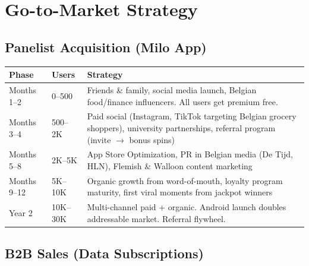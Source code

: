 \documentclass[11pt,a4paper]{article}
\begin{document}
\clearpage

\section{Go-to-Market Strategy}

\subsection{Panelist Acquisition (Milo App)}

\begin{center}
\renewcommand{\arraystretch}{1.3}
\begin{tabularx}{\textwidth}{C{2cm} C{2cm} L{9cm}}
\toprule
{}
\textbf{\color{white}Phase} & \textbf{\color{white}Users} & \textbf{\color{white}Strategy} \\
\midrule
Months 1--2 & 0--500 & Friends \& family, social media launch, Belgian food/finance influencers. All users get premium free. \\
Months 3--4 & 500--2K & Paid social (Instagram, TikTok targeting Belgian grocery shoppers), university partnerships, referral program (invite $\rightarrow$ bonus spins) \\
Months 5--8 & 2K--5K & App Store Optimization, PR in Belgian media (De Tijd, HLN), Flemish \& Walloon content marketing \\
Months 9--12 & 5K--10K & Organic growth from word-of-mouth, loyalty program maturity, first viral moments from jackpot winners \\
Year 2 & 10K--30K & Multi-channel paid + organic. Android launch doubles addressable market. Referral flywheel. \\
\bottomrule
\end{tabularx}
\end{center}

\subsection{B2B Sales (Data Subscriptions)}
\end{document}

